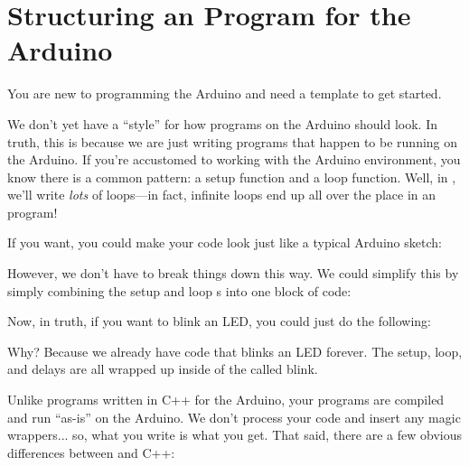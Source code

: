 \section{Structuring an \occam Program for the Arduino\label{structuring-for-arduino}}

\problem
You are new to programming the Arduino and need a template to get started.

\solution
We don't yet have a ``style'' for how \occam programs on the Arduino should look. In truth, this is because we are just writing \occam programs that happen to be running on the Arduino. If you're accustomed to working with the Arduino environment, you know there is a common pattern: a {\code setup} function and a {\code loop} function. Well, in \occam, we'll write \emph{lots} of loops---in fact, infinite loops end up all over the place in an \occam program!

If you want, you could make your code look just like a typical Arduino sketch:



However, we don't have to break things down this way. We could simplify this by simply combining the {\code setup} and {\code loop} {\PROC}s into one block of code:



Now, in truth, if you want to blink an LED, you could just do the following:



Why? Because we already have code that blinks an LED forever. The setup, loop, and delays are all wrapped up inside of the \PROC called {\code blink}.

\discussion

Unlike programs written in C++ for the Arduino, your \occam programs are compiled and run ``as-is'' on the Arduino. We don't process your code and insert any magic wrappers... so, what you write is what you get. That said, there are a few obvious differences between \occam and C++:

